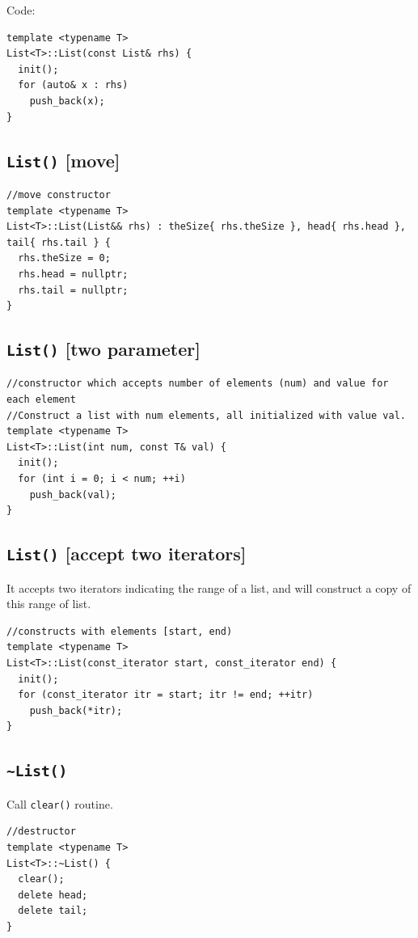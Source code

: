 \documentclass[12pt]{book}
\begin{document}
Code:
\begin{verbatim}
template <typename T>
List<T>::List(const List& rhs) {
  init();
  for (auto& x : rhs)
    push_back(x);
}
\end{verbatim}
\subsection{\texttt{List()} [move]}
\label{sec:orgd427cf9}
\begin{verbatim}
//move constructor
template <typename T>
List<T>::List(List&& rhs) : theSize{ rhs.theSize }, head{ rhs.head }, tail{ rhs.tail } {
  rhs.theSize = 0;
  rhs.head = nullptr;
  rhs.tail = nullptr;
}
\end{verbatim}
\subsection{\texttt{List()} [two parameter]}
\label{sec:org3664aff}
\begin{verbatim}
//constructor which accepts number of elements (num) and value for each element
//Construct a list with num elements, all initialized with value val.
template <typename T>
List<T>::List(int num, const T& val) {
  init();
  for (int i = 0; i < num; ++i)
    push_back(val);
}
\end{verbatim}
\subsection{\texttt{List()} [accept two iterators]}
\label{sec:orgab4f877}
It accepts two iterators indicating the range of a list, and will construct a copy of this range of list.
\begin{verbatim}
//constructs with elements [start, end)
template <typename T>
List<T>::List(const_iterator start, const_iterator end) {
  init();
  for (const_iterator itr = start; itr != end; ++itr)
    push_back(*itr);
}
\end{verbatim}
\subsection{\texttt{\textasciitilde{}List()}}
\label{sec:orge39a62d}
Call \texttt{clear()} routine.
\begin{verbatim}
//destructor
template <typename T>
List<T>::~List() {
  clear();
  delete head;
  delete tail;
}
\end{verbatim}
\end{document}
